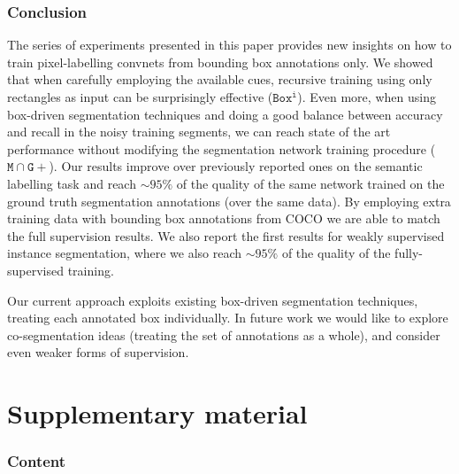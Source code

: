 \documentclass[10pt,english,british,twocolumn]{article}
\begin{document}
\section{\label{sec:Conclusion}Conclusion}

The series of experiments presented in this paper provides new insights
on how to train pixel-labelling convnets from bounding box annotations
only. We showed that when carefully employing the available cues,
recursive training using only rectangles as input can be surprisingly
effective ($\mathtt{Box^{i}}$). Even more, when using box-driven
segmentation techniques and doing a good balance between accuracy
and recall in the noisy training segments, we can reach state of the
art performance without modifying the segmentation network training
procedure ($\mathtt{M}\cap\mathtt{G+}$). Our results improve over
previously reported ones on the semantic labelling task and reach
$\sim\!95\%$ of the quality of the same network trained on the ground
truth segmentation annotations (over the same data). By employing
extra training data with bounding box annotations from COCO we are
able to match the full supervision results. We also report the first
results for weakly supervised instance segmentation, where we also
reach $\sim\!95\%$ of the quality of the fully-supervised training.

Our current approach exploits existing box-driven segmentation techniques,
treating each annotated box individually. In future work we would
like to explore co-segmentation ideas (treating the set of annotations
as a whole), and consider even weaker forms of supervision.



\clearpage{}


\appendix
\renewcommand{\thetable}{S\arabic{table}}\renewcommand{\thefigure}{S\arabic{figure}}

\part*{Supplementary material}

\setcounter{figure}{0}\setcounter{table}{0}

\section{\label{sec:Content}Content}
\end{document}
